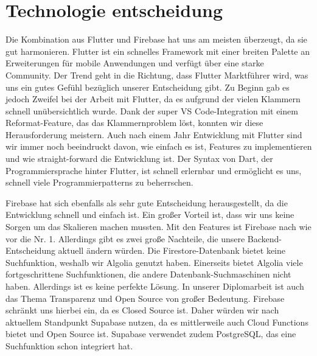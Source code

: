 \section{Technologie entscheidung}
Die Kombination aus Flutter und Firebase hat uns am meisten überzeugt, da sie gut harmonieren. Flutter ist ein schnelles Framework mit einer breiten Palette an Erweiterungen für mobile Anwendungen und verfügt über eine starke Community. Der Trend geht in die Richtung, dass Flutter Marktführer wird, was uns ein gutes Gefühl bezüglich unserer Entscheidung gibt. Zu Beginn gab es jedoch Zweifel bei der Arbeit mit Flutter, da es aufgrund der vielen Klammern schnell unübersichtlich wurde. Dank der super VS Code-Integration mit einem Reformat-Feature, das das Klammernproblem löst, konnten wir diese Herausforderung meistern. Auch nach einem Jahr Entwicklung mit Flutter sind wir immer noch beeindruckt davon, wie einfach es ist, Features zu implementieren und wie straight-forward die Entwicklung ist. Der Syntax von Dart, der Programmiersprache hinter Flutter, ist schnell erlernbar und ermöglicht es uns, schnell viele Programmierpatterns zu beherrschen.

Firebase hat sich ebenfalls als sehr gute Entscheidung herausgestellt, da die Entwicklung schnell und einfach ist. Ein großer Vorteil ist, dass wir uns keine Sorgen um das Skalieren machen mussten. Mit den Features ist Firebase nach wie vor die Nr. 1. Allerdings gibt es zwei große Nachteile, die unsere Backend-Entscheidung aktuell ändern würden. Die Firestore-Datenbank bietet keine Suchfunktion, weshalb wir Algolia genutzt haben. Einerseits bietet Algolia viele fortgeschrittene Suchfunktionen, die andere Datenbank-Suchmaschinen nicht haben. Allerdings ist es keine perfekte Lösung. In unserer Diplomarbeit ist auch das Thema Transparenz und Open Source von großer Bedeutung. Firebase schränkt uns hierbei ein, da es Closed Source ist. Daher würden wir nach aktuellem Standpunkt Supabase nutzen, da es mittlerweile auch Cloud Functions bietet und Open Source ist. Supabase verwendet zudem PostgreSQL, das eine Suchfunktion schon integriert hat.



